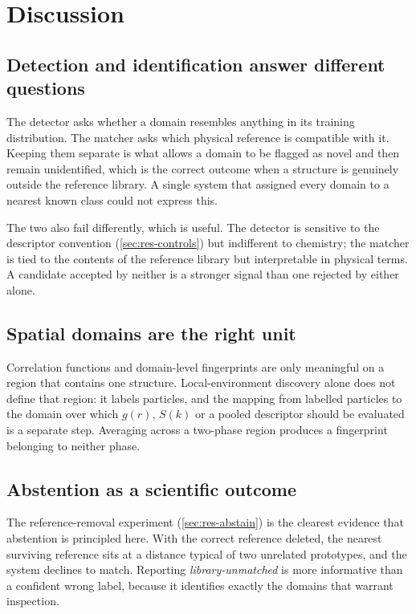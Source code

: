 \section{Discussion}
\label{sec:discussion}

\subsection{Detection and identification answer different questions}

The detector asks whether a domain resembles anything in its training distribution. The
matcher asks which physical reference is compatible with it. Keeping them separate is what
allows a domain to be flagged as novel and then remain unidentified, which is the correct
outcome when a structure is genuinely outside the reference library. A single system that
assigned every domain to a nearest known class could not express this.

The two also fail differently, which is useful. The detector is sensitive to the descriptor
convention (\cref{sec:res-controls}) but indifferent to chemistry; the matcher is tied to the
contents of the reference library but interpretable in physical terms. A candidate accepted
by neither is a stronger signal than one rejected by either alone.

\subsection{Spatial domains are the right unit}

Correlation functions and domain-level fingerprints are only meaningful on a region that
contains one structure. Local-environment discovery alone does not define that region: it
labels particles, and the mapping from labelled particles to the domain over which
$g(r)$, $S(k)$ or a pooled descriptor should be evaluated is a separate step. Averaging
across a two-phase region produces a fingerprint belonging to neither phase.

\subsection{Abstention as a scientific outcome}

The reference-removal experiment (\cref{sec:res-abstain}) is the clearest evidence that
abstention is principled here. With the correct reference deleted, the nearest surviving
reference sits at a distance typical of two unrelated prototypes, and the system declines to
match. Reporting \emph{library-unmatched} is more informative than a confident wrong label,
because it identifies exactly the domains that warrant inspection.

